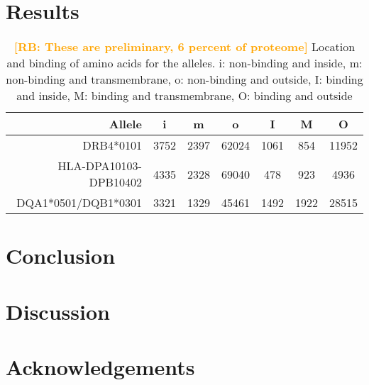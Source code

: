 \documentclass{article}
\newcommand{\richel}[1]{\textcolor{orange}{\textbf{[RB: #1]}}}
\begin{document}
\section{Results}

\begin{table}
\centering
  \begin{tabular}{| r | c | c | c | c | c | c |}
    \hline
    \textbf{Allele}       & \textbf{i} & \textbf{m} & \textbf{o} & \textbf{I} & \textbf{M} & \textbf{O} \\ 
    \hline
    DRB4*0101             & 3752 & 2397 & 62024 & 1061 & 854  & 11952 \\
    HLA-DPA10103-DPB10402 & 4335 & 2328 & 69040 & 478  & 923  & 4936 \\
    DQA1*0501/DQB1*0301   & 3321 & 1329 & 45461 & 1492 & 1922 & 28515 \\
    \hline 
  \end{tabular}
  \caption{
    \richel{These are preliminary, 6 percent of proteome}
    Location and binding of amino acids for the alleles.
    i: non-binding and inside, 
    m: non-binding and transmembrane, 
    o: non-binding and outside, 
    I: binding and inside, 
    M: binding and transmembrane, 
    O: binding and outside
  }
  \label{tab:results_old}
\end{table}




\section{Conclusion}

\section{Discussion}



\section{Acknowledgements}
\end{document}
